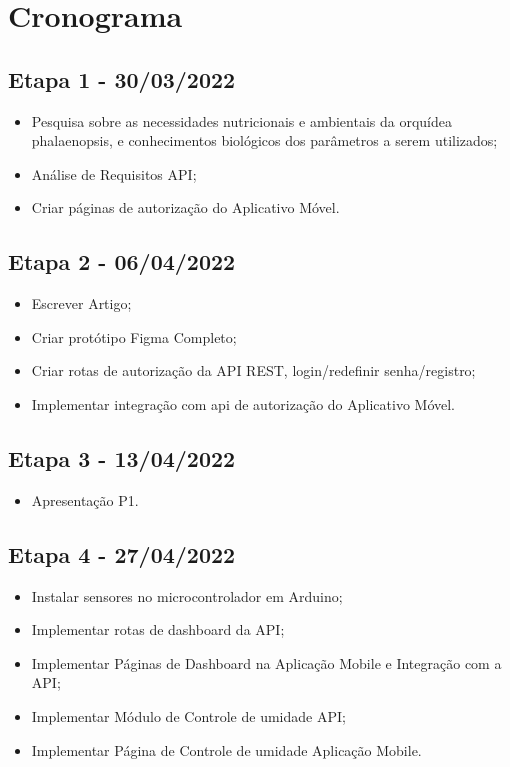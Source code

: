 \documentclass[conference]{IEEEtran}
\begin{document}
\section{Cronograma}

\subsection{Etapa 1 - 30/03/2022}
\begin{itemize}
    \item Pesquisa sobre as necessidades nutricionais e ambientais da orquídea phalaenopsis, e conhecimentos biológicos dos parâmetros a serem utilizados;
    \item Análise de Requisitos API;
    \item Criar páginas de autorização do Aplicativo Móvel.
\end{itemize}

\subsection{Etapa 2 -  06/04/2022}
\begin{itemize}
    \item Escrever Artigo;
    \item Criar protótipo Figma Completo;
    \item Criar rotas de autorização da API REST, login/redefinir senha/registro;
    \item Implementar integração com api de autorização do Aplicativo Móvel.
\end{itemize}

\subsection{Etapa 3 -  13/04/2022}
\begin{itemize}
    \item Apresentação P1.
\end{itemize}

\subsection{Etapa 4 - 27/04/2022}
\begin{itemize}
    \item Instalar sensores no microcontrolador em Arduino;
    \item Implementar rotas de dashboard da API;
    \item Implementar Páginas de Dashboard na  Aplicação Mobile e Integração com a API;
    \item Implementar Módulo de Controle de umidade API;
    \item Implementar Página de Controle de umidade Aplicação Mobile.
\end{itemize}
\end{document}
